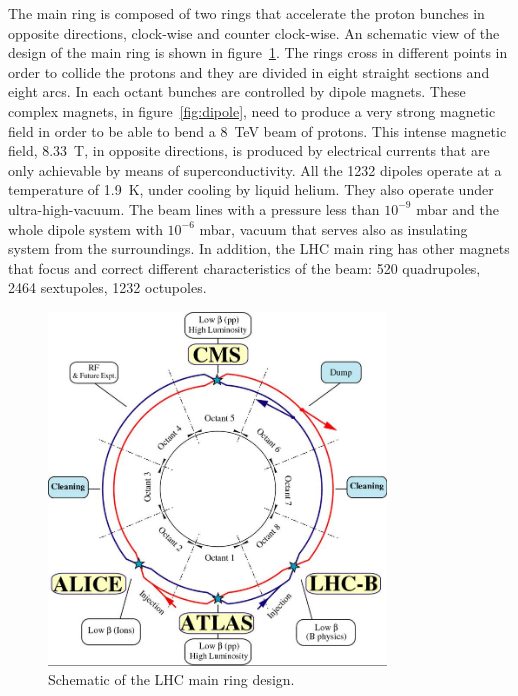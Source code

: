 The main ring is composed of two rings that accelerate the proton bunches in opposite directions, clock-wise and counter clock-wise. An schematic view of the design of the main ring is shown in figure~\ref{fig:schematic}. The rings cross in different points in order to collide the protons and they are divided in eight straight sections and eight arcs. In each octant bunches are controlled by dipole magnets. These complex magnets, in figure~\ref{fig:dipole}, need to produce a very strong magnetic field in order to be able to bend a 8~TeV beam of protons. This intense magnetic field, 8.33~T, in opposite directions, is produced by electrical currents that are only achievable by means of superconductivity. All the 1232 dipoles operate at a temperature of 1.9~K, under cooling by liquid helium. They also operate under ultra-high-vacuum. The beam lines with a pressure less than $10^{-9}$ mbar and the whole dipole system with $10^{-6}$ mbar, vacuum that serves also as insulating system from the surroundings. In addition, the LHC main ring has other magnets that focus and correct different characteristics of the beam: 520 quadrupoles, 2464 sextupoles, 1232 octupoles. 

\begin{figure}[!Hhtbp]
  \begin{center}
    \includegraphics[width=0.8\textwidth]{figs/lhc-schematic.jpg}
    \caption{Schematic of the LHC main ring design.}
    \label{fig:schematic}
  \end{center}
\end{figure}

